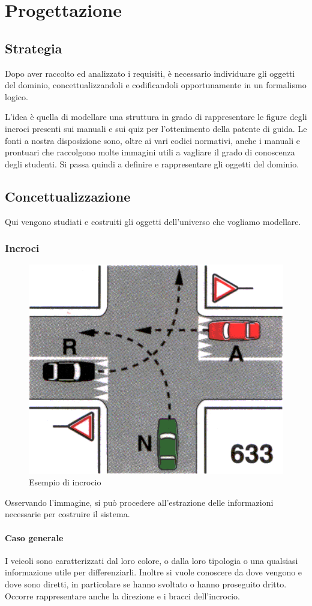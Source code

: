 \chapter{Progettazione}

\section{Strategia}
Dopo aver raccolto ed analizzato i requisiti, è necessario individuare gli oggetti del dominio, concettualizzandoli e codificandoli opportunamente in un formalismo logico.

L'idea è quella di modellare una struttura in grado di rappresentare le figure degli incroci presenti sui manuali e sui quiz per l'ottenimento della patente di guida. Le fonti a nostra disposizione sono, oltre ai vari codici normativi, anche i manuali e prontuari che raccolgono molte immagini utili a vagliare il grado di conoscenza degli studenti. Si passa quindi a definire e rappresentare gli oggetti del dominio.

\section{Concettualizzazione}
Qui vengono studiati e costruiti gli oggetti dell'universo che vogliamo modellare.

\subsection{Incroci}

\begin{figure}[htb]
	\centering
	\includegraphics[width=.5\textwidth]{images/example}
	\caption{Esempio di incrocio}
	\label{fig:inc}
\end{figure}


Osservando l'immagine, si può procedere all'estrazione delle informazioni necessarie per costruire il sistema.

\subsubsection{Caso generale}
\label{sssec:gen}
I veicoli sono caratterizzati dal loro colore, o dalla loro tipologia o una qualsiasi informazione utile per differenziarli. Inoltre si vuole conoscere da dove vengono e dove sono diretti, in particolare se hanno svoltato o hanno proseguito dritto. Occorre rappresentare anche la direzione e i bracci dell'incrocio.

